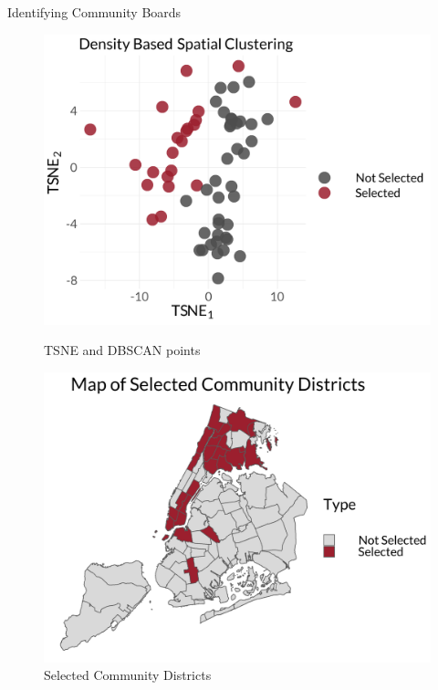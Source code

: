 \documentclass[final]{beamer}
\newlength{\colwidth}
\begin{document}
\begin{frame}[t]
\begin{columns}[t]
\begin{column}{\colwidth}
\begin{block}{Identifying Community Boards}
    \begin{figure}
        \begin{multicols}{2}
            \includegraphics[width = 0.5\colwidth]{pics/dbscan_plot.png}
            \caption{TSNE and DBSCAN points}
        
             \columnbreak
        
            \includegraphics[width = 0.5\colwidth]{pics/dbscan_map.png}
            \caption{Selected Community Districts}
        
        \end{multicols}
    \end{figure}

  \end{block}


\end{column}
\end{columns}
\end{frame}
\end{document}
